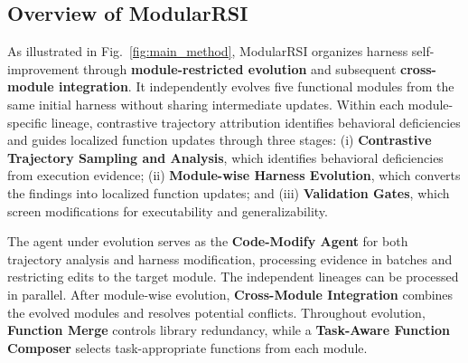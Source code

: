 \documentclass{article} %
\begin{document}
\subsection{Overview of ModularRSI}

As illustrated in Fig.~\ref{fig:main_method}, ModularRSI organizes harness self-improvement through \textbf{module-restricted evolution} and subsequent \textbf{cross-module integration}.
It independently evolves five functional modules from the same initial harness without sharing intermediate updates.
Within each module-specific lineage, contrastive trajectory attribution identifies behavioral deficiencies and guides localized function updates through three stages:
(i) \textbf{Contrastive Trajectory Sampling and Analysis}, which identifies behavioral deficiencies from execution evidence;
(ii) \textbf{Module-wise Harness Evolution}, which converts the findings into localized function updates; and
(iii) \textbf{Validation Gates}, which screen modifications for executability and generalizability.

The agent under evolution serves as the \textbf{Code-Modify Agent} for both trajectory analysis and harness modification, processing evidence in batches and restricting edits to the target module.
The independent lineages can be processed in parallel.
After module-wise evolution, \textbf{Cross-Module Integration} combines the evolved modules and resolves potential conflicts.
Throughout evolution, \textbf{Function Merge} controls library redundancy, while a \textbf{Task-Aware Function Composer} selects task-appropriate functions from each module.




\end{document}
